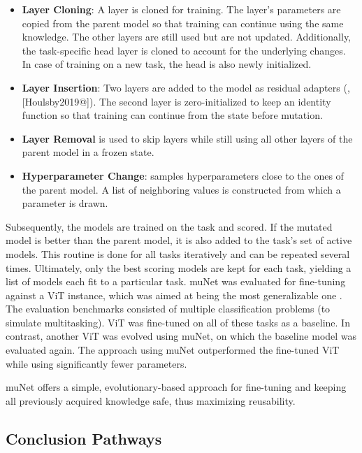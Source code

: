 \documentclass[
]{krantz}
\providecommand{\tightlist}{%
  \setlength{\itemsep}{0pt}\setlength{\parskip}{0pt}}
\begin{document}
\begin{itemize}
\tightlist
\item
  \textbf{Layer Cloning}: A layer is cloned for training. The layer's parameters are copied from the parent model so that training can continue using the same knowledge. The other layers are still used
  but are not updated. Additionally, the task-specific head layer is cloned to account for the underlying changes. In case of training on a new task, the head is also newly initialized.
\item
  \textbf{Layer Insertion}: Two layers are added to the model as residual adapters (\citep{Rebuffi2017}, {[}Houlsby2019@{]}). The second layer is zero-initialized to keep an identity function so that training
  can continue from the state before mutation.
\item
  \textbf{Layer Removal} is used to skip layers while still using all other layers of the parent model in a frozen state.
\item
  \textbf{Hyperparameter Change}: samples hyperparameters close to the ones of the parent model. A list of neighboring values is constructed from which a parameter is drawn.
\end{itemize}

Subsequently, the models are trained on the task and scored. If the mutated model is better than the parent model, it is also added to the task's set of active models. This routine is done for
all tasks iteratively and can be repeated several times. Ultimately, only the best scoring models are kept for each task, yielding a list of models each fit to a particular task.
muNet was evaluated for fine-tuning against a ViT instance, which was aimed at being the most generalizable one \citep{Steiner2021}. The evaluation benchmarks consisted of multiple classification problems
(to simulate multitasking). ViT was fine-tuned on all of these tasks as a baseline. In contrast, another ViT was evolved using muNet, on which the baseline model was evaluated again. The approach using
muNet outperformed the fine-tuned ViT while using significantly fewer parameters.

muNet offers a simple, evolutionary-based approach for fine-tuning and keeping all previously acquired knowledge safe, thus maximizing reusability.

\hypertarget{conclusion-pathways}{%
\subsection{Conclusion Pathways}\label{conclusion-pathways}}
\end{document}

